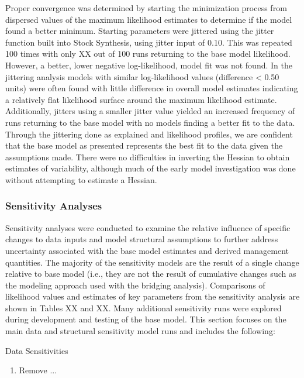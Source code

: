 \documentclass[11pt,
  english,
  letterpaper,
]{article}
\begin{document}
Proper convergence was determined by starting the minimization process from dispersed values of the maximum likelihood estimates to determine if the model found a better minimum. Starting parameters were jittered using the jitter function built into Stock Synthesis, using jitter input of 0.10. This was repeated 100 times with only XX out of 100 runs returning to the base model likelihood. However, a better, lower negative log-likelihood, model fit was not found. In the jittering analysis models with similar log-likelihood values (difference \textless{} 0.50 units) were often found with little difference in overall model estimates indicating a relatively flat likelihood surface around the maximum likelihood estimate. Additionally, jitters using a smaller jitter value yielded an increased frequency of runs returning to the base model with no models finding a better fit to the data. Through the jittering done as explained and likelihood profiles, we are confident that the base model as presented represents the best fit to the data given the assumptions made. There were no difficulties in inverting the Hessian to obtain estimates of variability, although much of the early model investigation was done without attempting to estimate a Hessian.

\hypertarget{sensitivity-analyses}{%
\subsubsection{Sensitivity Analyses}\label{sensitivity-analyses}}

Sensitivity analyses were conducted to examine the relative influence of specific changes to data inputs and model structural assumptions to further address uncertainty associated with the base model estimates and derived management quantities. The majority of the sensitivity models are the result of a single change relative to base model (i.e., they are not the result of cumulative changes such as the modeling approach used with the bridging analysis). Comparisons of likelihood values and estimates of key parameters from the sensitivity analysis are shown in Tables XX and XX. Many additional sensitivity runs were explored during development and testing of the base model. This section focuses on the main data and structural sensitivity model runs and includes the following:

Data Sensitivities

\begin{enumerate}
   
  \item Remove ...
  
\end{enumerate}
\end{document}
